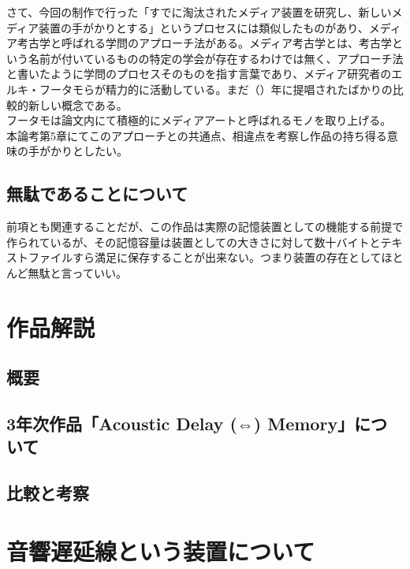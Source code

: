 さて、今回の制作で行った「すでに淘汰されたメディア装置を研究し、新しいメディア装置の手がかりとする」というプロセスには類似したものがあり、メディア考古学と呼ばれる学問のアプローチ法がある。メディア考古学とは、考古学という名前が付いているものの特定の学会が存在するわけでは無く、アプローチ法と書いたように学問のプロセスそのものを指す言葉であり、メディア研究者のエルキ・フータモらが精力的に活動している。まだ（）年に提唱されたばかりの比較的新しい概念である。\\
フータモは論文内にて積極的にメディアアートと呼ばれるモノを取り上げる。\\
本論考第5章にてこのアプローチとの共通点、相違点を考察し作品の持ち得る意味の手がかりとしたい。

\section{無駄であることについて}\label{ux7121ux99c4ux3067ux3042ux308bux3053ux3068ux306bux3064ux3044ux3066}

前項とも関連することだが、この作品は実際の記憶装置としての機能する前提で作られているが、その記憶容量は装置としての大きさに対して数十バイトとテキストファイルすら満足に保存することが出来ない。つまり装置の存在としてほとんど無駄と言っていい。

\chapter{作品解説}\label{ux4f5cux54c1ux89e3ux8aac}

\section{概要}\label{ux6982ux8981}

\section{3年次作品「Acoustic Delay (⇔)
Memory」について}\label{ux5e74ux6b21ux4f5cux54c1acoustic-delay-memoryux306bux3064ux3044ux3066}

\section{比較と考察}\label{ux6bd4ux8f03ux3068ux8003ux5bdf}

\chapter{音響遅延線という装置について}\label{ux97f3ux97ffux9045ux5ef6ux7ddaux3068ux3044ux3046ux88c5ux7f6eux306bux3064ux3044ux3066}

